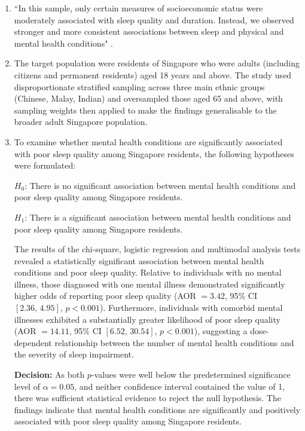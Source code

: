 \begin{enumerate}[label=\alph*)]
    \item ``In this sample, only certain measures of socioeconomic status were moderately associated with sleep quality and duration. Instead, we observed stronger and more consistent associations between sleep and physical and mental health conditions" \cite{lee2022}.

    \item The target population were residents of Singapore who were adults (including citizens and permanent residents) aged 18 years and above. The study used disproportionate stratified sampling across three main ethnic groups (Chinese, Malay, Indian) and oversampled those aged 65 and above, with sampling weights then applied to make the findings generalisable to the broader adult Singapore population.

    \item To examine whether mental health conditions are significantly associated with poor sleep quality among Singapore residents, the following hypotheses were formulated:

    \noindent$H_0$: There is no significant association between mental health conditions and poor sleep quality among Singapore residents.

    \noindent$H_1$: There is a significant association between mental health conditions and poor sleep quality among Singapore residents.

    The results of the chi-square, logistic regression and multimodal analysis tests revealed a statistically significant association between mental health conditions and poor sleep quality. Relative to individuals with no mental illness, those diagnosed with one mental illness demonstrated significantly higher odds of reporting poor sleep quality (AOR $= 3.42$, 95\% CI $[2.36,\, 4.95]$, $p < 0.001$). Furthermore, individuals with comorbid mental illnesses exhibited a substantially greater likelihood of poor sleep quality (AOR $= 14.11$, 95\% CI $[6.52,\, 30.54]$, $p < 0.001$), suggesting a dose-dependent relationship between the number of mental health conditions and the severity of sleep impairment.

    \noindent\textbf{Decision:} As both $p$-values were well below the predetermined significance level of $\alpha = 0.05$, and neither confidence interval contained the value of 1, there was sufficient statistical evidence to reject the null hypothesis. The findings indicate that mental health conditions are significantly and positively associated with poor sleep quality among Singapore residents.
\end{enumerate}

